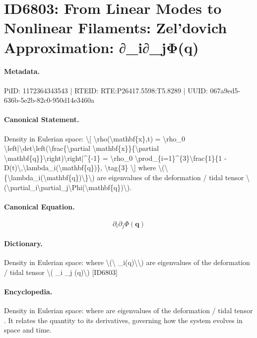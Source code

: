 \section*{ID6803: From Linear Modes to Nonlinear Filaments: Zel’dovich Approximation: ∂\_i∂\_jΦ(q)}
\paragraph{Metadata.}
PiID: 1172364343543 | RTEID: RTE:P26417.5598:T5.8289 | UUID: 067a9ed5-636b-5e2b-82c0-950d14e3460a

\paragraph{Canonical Statement.}
Density in Eulerian space: \textbackslash{}[ \textbackslash{}rho(\textbackslash{}mathbf\{x\},t) = \textbackslash{}rho\_0 \textbackslash{}left|\textbackslash{}det\textbackslash{}left(\textbackslash{}frac\{\textbackslash{}partial \textbackslash{}mathbf\{x\}\}\{\textbackslash{}partial \textbackslash{}mathbf\{q\}\}\textbackslash{}right)\textbackslash{}right|\textasciicircum{}\{-1\} = \textbackslash{}rho\_0 \textbackslash{}prod\_\{i=1\}\textasciicircum{}\{3\}\textbackslash{}frac\{1\}\{1 - D(t)\textbackslash{},\textbackslash{}lambda\_i(\textbackslash{}mathbf\{q\})\}, \textbackslash{}tag\{3\} \textbackslash{}] where \textbackslash{}(\textbackslash{}\{\textbackslash{}lambda\_i(\textbackslash{}mathbf\{q\})\textbackslash{}\}\textbackslash{}) are eigenvalues of the deformation / tidal tensor \textbackslash{}(\textbackslash{}partial\_i\textbackslash{}partial\_j\textbackslash{}Phi(\textbackslash{}mathbf\{q\})\textbackslash{}).

\paragraph{Canonical Equation.}
\[
\partial_i\partial_j\Phi(\mathbf{q})
\]

\paragraph{Dictionary.}
Density in Eulerian space: where \textbackslash{}(\textbackslash{} \_i(q)\textbackslash{}\textbackslash{}) are eigenvalues of the deformation / tidal tensor \textbackslash{}( \_i \_j (q)\textbackslash{}) [ID6803]

\paragraph{Encyclopedia.}
Density in Eulerian space: where are eigenvalues of the deformation / tidal tensor . It relates the quantity to its derivatives, governing how the system evolves in space and time.
